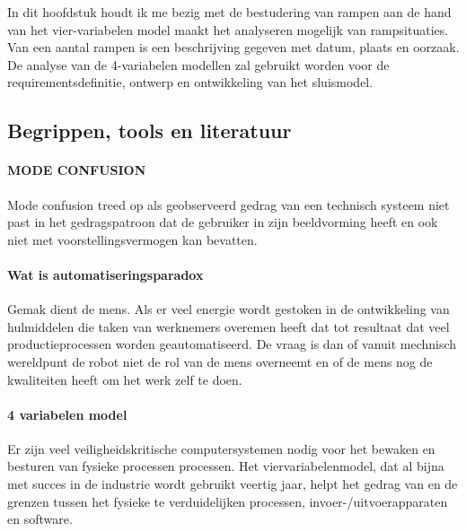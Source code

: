 \documentclass{article}
\begin{document}
	
	In dit hoofdstuk houdt ik me bezig met de bestudering van rampen aan de hand van het vier-variabelen model  maakt het analyseren mogelijk van rampsituaties. Van een aantal rampen is een beschrijving gegeven met datum, plaats en oorzaak. De analyse van de 4-variabelen modellen zal gebruikt worden voor de requirementsdefinitie, ontwerp en ontwikkeling van het sluismodel. 
	
	
	
	\subsection{Begrippen, tools en literatuur}
	

	
	\paragraph{MODE CONFUSION }
	Mode confusion treed op als geobserveerd gedrag van een technisch systeem niet past in het gedragspatroon dat de gebruiker in zijn beeldvorming heeft  en ook niet met voorstellingsvermogen kan bevatten.
	
	\paragraph{Wat is automatiseringsparadox}
	Gemak dient de mens. Als er veel energie wordt gestoken in de ontwikkeling van hulmiddelen die taken van werknemers overemen heeft dat tot resultaat dat veel productieprocessen worden geautomatiseerd. De vraag is dan of vanuit mechnisch wereldpunt de robot niet de rol van de mens overneemt en of de mens nog de kwaliteiten heeft om het werk zelf te doen.
	\cite{bicker21102016automatiseringsparadox}
	\cite{vseautoparadox}
	\cite{blogxot21112016slimapparaat}
	
	
	
	\paragraph{4 variabelen model}
	
	Er zijn veel veiligheidskritische computersystemen nodig voor het bewaken en besturen van fysieke processen
	processen. Het viervariabelenmodel, dat al bijna met succes in de industrie wordt gebruikt
	veertig jaar, helpt het gedrag van en de grenzen tussen het fysieke te verduidelijken
	processen, invoer-/uitvoerapparaten en software. \cite{ImplementabilityOf4VarSCP2015}
	
	
	
\end{document}
